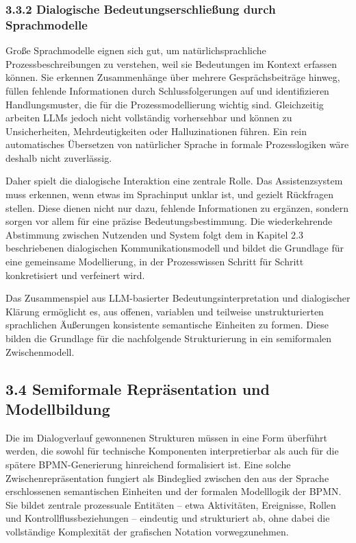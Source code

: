 \documentclass[a4paper,12pt]{scrreprt}
\begin{document}
\subsubsection*{3.3.2 Dialogische Bedeutungserschließung durch Sprachmodelle}

Große Sprachmodelle eignen sich gut, um natürlichsprachliche Prozessbeschreibungen zu verstehen, weil sie Bedeutungen im Kontext erfassen können. Sie erkennen Zusammenhänge über mehrere Gesprächsbeiträge hinweg, füllen fehlende Informationen durch Schlussfolgerungen auf und identifizieren Handlungsmuster, die für die Prozessmodellierung wichtig sind. Gleichzeitig arbeiten LLMs jedoch nicht vollständig vorhersehbar und können zu Unsicherheiten, Mehrdeutigkeiten oder Halluzinationen führen. Ein rein automatisches Übersetzen von natürlicher Sprache in formale Prozesslogiken wäre deshalb nicht zuverlässig.

Daher spielt die dialogische Interaktion eine zentrale Rolle. Das Assistenzsystem muss erkennen, wenn etwas im Sprachinput unklar ist, und gezielt Rückfragen stellen. Diese dienen nicht nur dazu, fehlende Informationen zu ergänzen, sondern sorgen vor allem für eine präzise Bedeutungsbestimmung. Die wiederkehrende Abstimmung zwischen Nutzenden und System folgt dem in Kapitel 2.3 beschriebenen dialogischen Kommunikationsmodell und bildet die Grundlage für eine gemeinsame Modellierung, in der Prozesswissen Schritt für Schritt konkretisiert und verfeinert wird.

Das Zusammenspiel aus LLM-basierter Bedeutungsinterpretation und dialogischer Klärung ermöglicht es, aus offenen, variablen und teilweise unstrukturierten sprachlichen Äußerungen konsistente semantische Einheiten zu formen. Diese bilden die Grundlage für die nachfolgende Strukturierung in ein semiformalen Zwischenmodell.


\subsection*{3.4 Semiformale Repräsentation und Modellbildung}

Die im Dialogverlauf gewonnenen Strukturen müssen in eine Form überführt werden, die sowohl für technische Komponenten interpretierbar als auch für die spätere BPMN-Generierung hinreichend formalisiert ist. Eine solche Zwischenrepräsentation fungiert als Bindeglied zwischen den aus der Sprache erschlossenen semantischen Einheiten und der formalen Modelllogik der BPMN. Sie bildet zentrale prozessuale Entitäten – etwa Aktivitäten, Ereignisse, Rollen und Kontrollflussbeziehungen – eindeutig und strukturiert ab, ohne dabei die vollständige Komplexität der grafischen Notation vorwegzunehmen.
\end{document}
